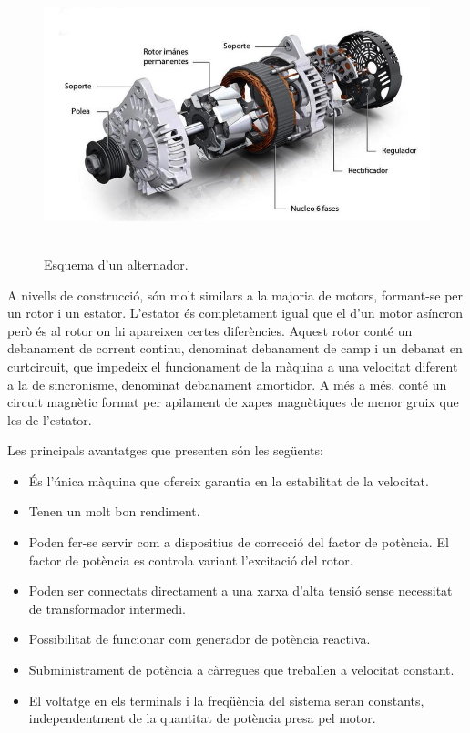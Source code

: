\begin{figure}[H]
		\centering
    	\includegraphics[width=\textwidth,height=8cm]{Motors/alternador.jpg}
     	\caption{Esquema d'un alternador.} 
\end{figure}


A nivells de construcció, són molt similars a la majoria de motors, formant-se per un rotor i un estator. L'estator és completament igual que el d'un motor asíncron però és al rotor on hi apareixen certes diferències. Aquest rotor conté un debanament de corrent continu, denominat debanament de camp i un debanat en curtcircuit, que impedeix el funcionament de la màquina a una velocitat diferent a la de sincronisme, denominat debanament amortidor. A més a més, conté un circuit magnètic format per apilament de xapes magnètiques de menor gruix que les de l'estator.

Les principals avantatges que presenten són les següents:
\begin{itemize}
    \item És l'única màquina que ofereix garantia en la estabilitat de la velocitat.
    \item Tenen un molt bon rendiment.
    \item Poden fer-se servir com a dispositius de correcció del factor de \newline potència. El factor de potència es controla variant l'excitació del rotor.
    \item Poden ser connectats directament a una xarxa d'alta tensió sense necessitat de transformador intermedi.
    \item Possibilitat de funcionar com generador de potència reactiva.
    \item Subministrament de potència a càrregues que treballen a velocitat constant.
    \item El voltatge en els terminals i la freqüència del sistema seran constants, independentment de la quantitat de potència presa pel motor.
\end{itemize}

